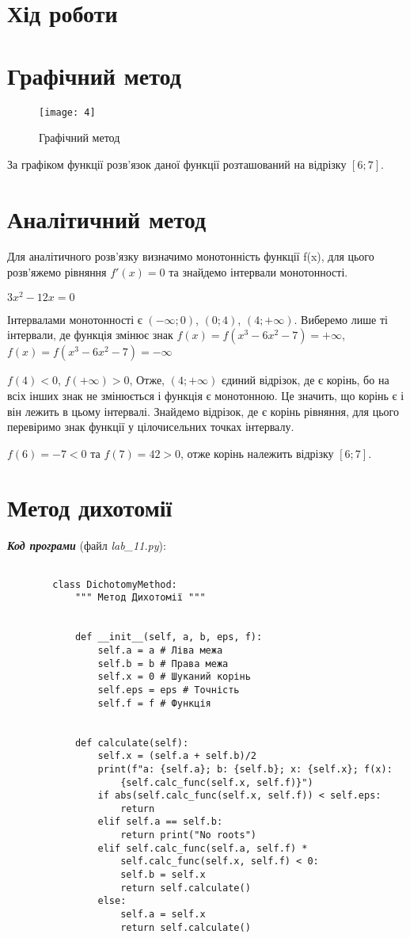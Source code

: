 \documentclass{article}
\begin{document}
\begin{normalsize}
	\section*{Хід роботи}
	\section*{Графічний метод}
	\begin{figure}[h!]
		\centering
		\texttt{[image: 4]}
		\caption{Графічний метод}
	\end{figure}

	За графіком функції розв'язок даної функції розташований на відрізку $[6; 7]$.

	\section*{Аналітичний метод}
	Для аналітичного розв’язку визначимо монотонність функції f(x), для цього розв’яжемо рівняння $f'(x) = 0$ та знайдемо інтервали монотонності.
	
	$3x^2-12x=0$
	
	Інтервалами монотонності є $(-\infty; 0)$, $(0; 4)$, $(4; +\infty)$. Виберемо лише ті інтервали, де функція змінює знак $f(x) = f(x^3-6x^2-7) = +\infty$, $f(x) = f(x^3-6x^2-7) = -\infty$
	
	$f(4) < 0$, $f(+\infty) > 0$, Отже, $(4; +\infty)$ єдиний відрізок, де є корінь, бо на всіх інших знак не змінюється і функція є монотонною. Це значить, що корінь є і він лежить в цьому інтервалі. Знайдемо відрізок, де є корінь рівняння, для цього перевіримо знак функції у цілочисельних точках інтервалу.
	
	$f(6) = -7 < 0$ та $f(7) = 42 > 0$, отже корінь належить відрізку $[6; 7]$.
	
	\section*{Метод дихотомії}
	\textbf{\textit{Код програми}} (файл \textit{lab\_11.py}):
	\begin{lstlisting}
		
		class DichotomyMethod:
			""" Метод Дихотомії """
			
			
			def __init__(self, a, b, eps, f):
				self.a = a # Ліва межа
				self.b = b # Права межа
				self.x = 0 # Шуканий корінь
				self.eps = eps # Точність
				self.f = f # Функція
			
			
			def calculate(self):
				self.x = (self.a + self.b)/2
				print(f"a: {self.a}; b: {self.b}; x: {self.x}; f(x): 
					{self.calc_func(self.x, self.f)}")
				if abs(self.calc_func(self.x, self.f)) < self.eps: 
					return
				elif self.a == self.b: 
					return print("No roots")
				elif self.calc_func(self.a, self.f) * 
					self.calc_func(self.x, self.f) < 0:
					self.b = self.x
					return self.calculate()
				else:
					self.a = self.x
					return self.calculate()
			

\end{lstlisting}
\end{normalsize}
\end{document}
